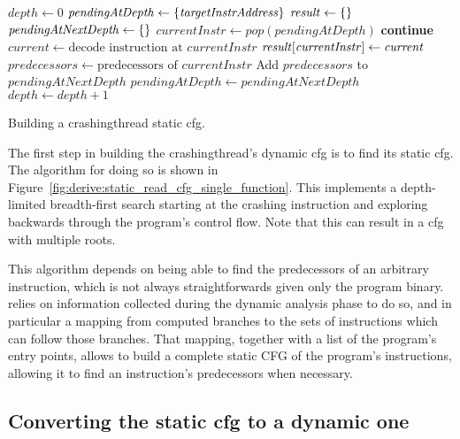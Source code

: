 \begin{sanefig}
\begin{algorithmic}[1]
\State $\mathit{depth} \gets 0$
\State $\mathit{pendingAtDepth} \gets \{\mathit{targetInstrAddress}\}$
\State $\mathit{result} \gets \{\}$
  \State $\mathit{pendingAtNextDepth} \gets \{\}$
    \State $\mathit{currentInstr} \gets \mathit{pop}(\mathit{pendingAtDepth})$
      \State \textbf{continue}
    \EndIf
    \State $\mathit{current} \gets \text{decode instruction at } \mathit{currentInstr}$
    \State $\mathit{result}[\mathit{currentInstr}] \gets \mathit{current}$
    \State $\mathit{predecessors} \gets \text{predecessors of } \mathit{currentInstr}$
    \State Add $\mathit{predecessors}$ to $\mathit{pendingAtNextDepth}$
  \EndWhile
  \State $\mathit{pendingAtDepth} \gets \mathit{pendingAtNextDepth}$
  \State $\mathit{depth} \gets \mathit{depth} + 1$
\EndWhile
\end{algorithmic}
\vspace{-6pt}
\caption{Building a \gls{crashingthread} static \gls{cfg}.}
\label{fig:derive:static_read_cfg_single_function}
\end{sanefig}

\noindent
The first step in building the \gls{crashingthread}'s dynamic
\gls{cfg} is to find its static \gls{cfg}.  The algorithm for doing so
is shown in Figure~\ref{fig:derive:static_read_cfg_single_function}.
This implements a depth-limited breadth-first search starting at the
crashing instruction and exploring backwards through the program's
control flow.  Note that this can result in a \gls{cfg} with multiple
roots.

This algorithm depends on being able to find the predecessors of an
arbitrary instruction, which is not always straightforwards given only
the program binary.  {\Technique} relies on information collected
during the dynamic analysis phase to do so, and in particular a
mapping from computed branches to the sets of instructions which can
follow those branches.  That mapping, together with a list of the
program's entry points, allows {\technique} to build a complete static
CFG of the program's instructions, allowing it to find an
instruction's predecessors when necessary.

\subsection[Converting the static \glsentrytext{cfg} to a dynamic one]{Converting the static \gls{cfg} to a dynamic one}
\label{sect:derive:handling_loops}


